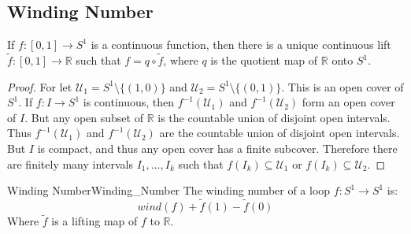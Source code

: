\documentclass{book}                                                           %
\begin{document}
    \subsection{Winding Number}
        \begin{theorem}
            If $f:[0,1]\rightarrow{S}^{1}$ is a continuous
            function, then there is a unique continuous lift
            $\tilde{f}:[0,1]\rightarrow\mathbb{R}$ such that
            $f=q\circ\tilde{f}$, where $q$ is the quotient map
            of $\mathbb{R}$ onto $S^{1}$.
        \end{theorem}
        \begin{proof}
            For let $\mathcal{U}_{1}=S^{1}\setminus\{(1,0)\}$ and
            $\mathcal{U}_{2}=S^{1}\setminus\{(0,1)\}$. This is an
            open cover of $S^{1}$. If $f:I\rightarrow{S}^{1}$ is
            continuous, then $f^{-1}(\mathcal{U}_{1})$ and
            $f^{-1}(\mathcal{U}_{2})$ form an open cover of
            $I$. But any open subset of $\mathbb{R}$ is the
            countable union of disjoint open intervals. Thus
            $f^{-1}(\mathcal{U}_{1})$ and
            $f^{-1}(\mathcal{U}_{2})$ are the countable union of
            disjoint open intervals. But $I$ is compact, and
            thus any open cover has a finite subcover. Therefore
            there are finitely many intervals $I_{1},\dots,I_{k}$
            such that $f(I_{k})\subseteq\mathcal{U}_{1}$ or
            $f(I_{k})\subseteq\mathcal{U}_{2}$.
        \end{proof}
        \begin{ldefinition}{Winding Number}{Winding_Number}
            The winding number of a loop
            $f:S^{1}\rightarrow{S}^{1}$ is:
            \begin{equation}
                wind(f)+\tilde{f}(1)-\tilde{f}(0)
            \end{equation}
            Where $\tilde{f}$ is a lifting map of $f$ to
            $\mathbb{R}$.
        \end{ldefinition}
\end{document}
